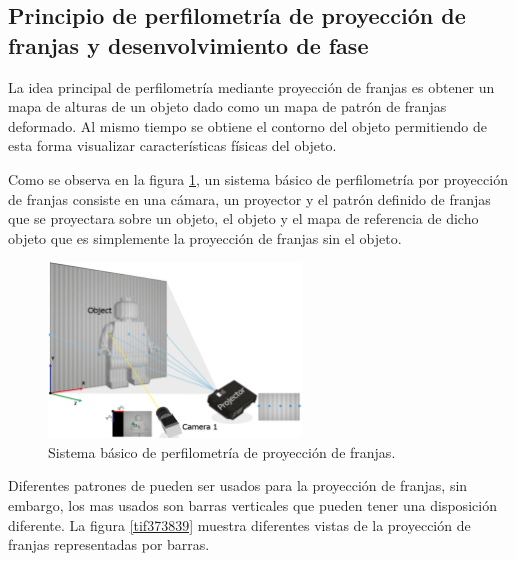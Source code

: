 \documentclass[10pt,letterpaper]{article}
\begin{document}
\subsection{Principio de perfilometría de proyección de franjas y desenvolvimiento de fase}
La idea principal de perfilometría mediante proyección de franjas es obtener un mapa de alturas de un objeto dado como un mapa de patrón de franjas deformado. Al mismo tiempo se obtiene el contorno del objeto permitiendo de esta forma visualizar características físicas del objeto\cite{Yosh:}. %

Como se observa en la figura \ref{tif36}, un sistema básico de perfilometría por proyección de franjas consiste en una cámara, un proyector y el patrón definido de franjas que se proyectara sobre un objeto, el objeto y el mapa de referencia de dicho objeto que es simplemente la proyección de franjas sin el objeto.

\begin{figure}[H]
	\centering
    \includegraphics[width=0.6\textwidth]{tifs/tif36.png}
    \caption{Sistema básico de perfilometría de proyección de franjas.}
    \label{tif36}
\end{figure}

Diferentes patrones de pueden ser usados para la proyección de franjas, sin embargo, los mas usados son barras verticales que pueden tener una disposición diferente. La figura \ref{tif373839} muestra diferentes vistas de la proyección de franjas representadas por barras.
\end{document}
